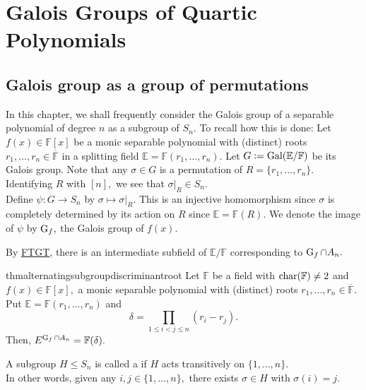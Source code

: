\chapter{Galois Groups of Quartic Polynomials}

\section{Galois group as a group of permutations}

In this chapter, we shall frequently consider the Galois group of a separable polynomial of degree $n$ as a subgroup of $S_n.$ To recall how this is done: Let $f(x) \in \mathbb{F}[x]$ be a monic separable polynomial with (distinct) roots $r_1, \ldots, r_n \in \overline{\mathbb{F}}$ in a splitting field $\mathbb{E} = \mathbb{F}(r_1, \ldots, r_n).$ Let $G \vcentcolon= \operatorname{Gal}(\mathbb{E}/\mathbb{F})$ be its Galois group. Note that any $\sigma \in G$ is a permutation of $R = \{r_1, \ldots, r_n\}.$ Identifying $R$ with $[n],$ we see that $\sigma|_R \in S_n.$ \\
Define $\psi : G \to S_n$ by $\sigma \mapsto \sigma|_R.$ This is an injective homomorphism since $\sigma$ is completely determined by its action on $R$ since $\mathbb{E} = \mathbb{F}(R).$ We denote the image of $\psi$ by $\operatorname{G}_f,$ the Galois group of $f(x).$

By \hyperref[thm:FTGT]{FTGT}, there is an intermediate subfield of $\mathbb{E}/\mathbb{F}$ corresponding to $\operatorname{G}_f \cap A_n.$

\begin{restatable}[]{thm}{alternatingsubgroupdiscriminantroot}
\label{thm:alternatingsubgroupdiscriminantroot}
	Let $\mathbb{F}$ be a field with $\operatorname{char}(\mathbb{F}) \neq 2$ and $f(x) \in \mathbb{F}[x],$ a monic separable polynomial with (distinct) roots $r_1, \ldots, r_n \in \overline{\mathbb{F}}.$ Put $\mathbb{E} = \mathbb{F}(r_1, \ldots, r_n)$ and 
	\begin{equation*} 
		\delta = \prod_{1 \le i < j \le n} (r_i - r_j).
	\end{equation*}
	Then, $E^{\operatorname{G}_f \cap A_n} = \mathbb{F}(\delta).$ \hfill\hyperref[thm:alternatingsubgroupdiscriminantroot2]{\downsym}
\end{restatable}

\begin{defn}
	A subgroup $H \le S_n$ is called a  if $H$ acts transitively on $\{1, \ldots, n\}.$ \\
	In other words, given any $i, j \in \{1, \ldots, n\},$ there exists $\sigma \in H$ with $\sigma(i) = j.$
\end{defn}


